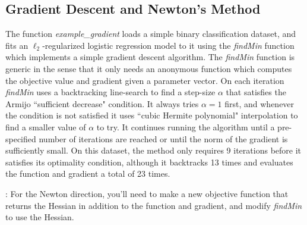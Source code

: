 \documentclass{article}
\begin{document}
\subsection{Gradient Descent and Newton's Method}

The function \emph{example\_gradient} loads a simple binary classification dataset, and fits an $\ell_2$-regularized logistic regression model to it using the \emph{findMin} function which implements a simple gradient descent algorithm. The \emph{findMin} function is generic in the sense that it only needs an anonymous function which computes the objective value and gradient given a parameter vector. On each iteration \emph{findMin} uses a backtracking line-search to find a step-size $\alpha$ that satisfies the Armijo ``sufficient decrease" condition. It always tries $\alpha = 1$ first, and whenever the condition is not satisfied it uses ``cubic Hermite polynomial" interpolation to find a smaller value of $\alpha$ to try. It continues running the algorithm until a pre-specified number of iterations are reached or until the norm of the gradient is sufficiently small. On this dataset, the method only requires 9 iterations before it satisfies its optimality condition, although it backtracks 13 times and evaluates the function and gradient a total of 23 times.

:
For the Newton direction, you'll need to make a new objective function that returns the Hessian in addition to the function and gradient, and modify \emph{findMin} to use the Hessian.
\end{document}

